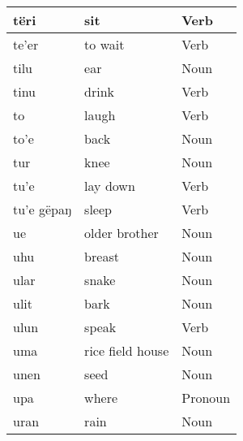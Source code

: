 \documentclass{article}
\begin{document}
\begin{longtable}{|l|l|l|}
tëri                    & sit                 & {\color[HTML]{009901} Verb}                        \\ \hline
te'er                   & to wait             & {\color[HTML]{009901} Verb}                        \\ \hline
tilu                    & ear                 & {\color[HTML]{009901} Noun}                        \\ \hline
tinu                    & drink               & {\color[HTML]{009901} Verb}                        \\ \hline
to                      & laugh               & {\color[HTML]{009901} Verb}                        \\ \hline
to'e                    & back                & {\color[HTML]{009901} Noun}                        \\ \hline
tur                     & knee                & {\color[HTML]{009901} Noun}                        \\ \hline
tu'e                    & lay down            & {\color[HTML]{009901} Verb}                        \\ \hline
tu'e gëpaŋ              & sleep               & {\color[HTML]{009901} Verb}                        \\ \hline
ue                      & older brother       & {\color[HTML]{009901} Noun}                        \\ \hline
uhu                     & breast              & {\color[HTML]{009901} Noun}                        \\ \hline
ular                    & snake               & {\color[HTML]{009901} Noun}                        \\ \hline
ulit                    & bark                & {\color[HTML]{009901} Noun}                        \\ \hline
ulun                    & speak               & {\color[HTML]{009901} Verb}                        \\ \hline
uma                     & rice field house    & {\color[HTML]{009901} Noun}                        \\ \hline
unen                    & seed                & {\color[HTML]{009901} Noun}                        \\ \hline
upa                     & where               & {\color[HTML]{009901} Pronoun}                     \\ \hline
uran                    & rain                & {\color[HTML]{009901} Noun}                        \\ \hline

\end{longtable}
\end{document}
